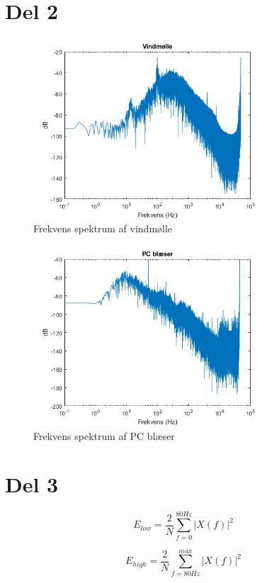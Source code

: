 \section{Del 2}

\begin{figure}[h]
\centering
\includegraphics[width=0.8\textwidth]{"figures/Windmill_frekvens"}
\caption{Frekvens spektrum af vindmølle}
\label{fig:WM_freq}
\end{figure}

\begin{figure}[h]
\centering
\includegraphics[width=0.8\textwidth]{"figures/pcFan_frekvens"}
\caption{Frekvens spektrum af PC blæser}
\label{fig:pc_freq}
\end{figure}


\section{Del 3}

\begin{equation}
E_{low} = \frac{2}{N} \sum_{f=0}^{80Hz} |X(f)|^2
\end{equation}

\begin{equation}
E_{high} = \frac{2}{N} \sum_{f=80Hz}^{max} |X(f)|^2
\end{equation}

